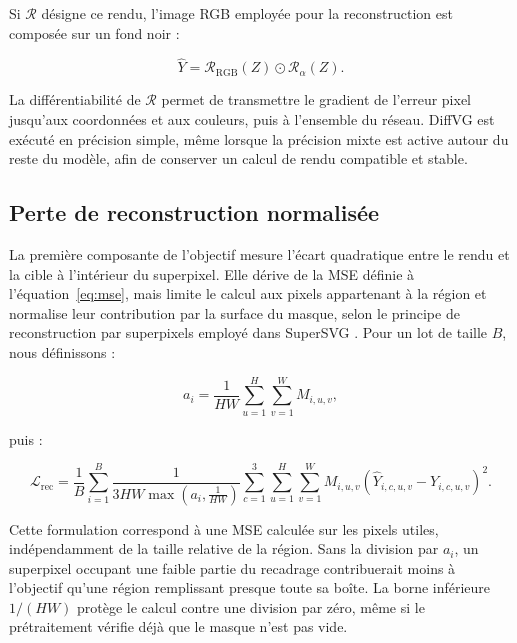 \documentclass[12pt, a4paper, oneside]{report}
\begin{document}
Si $\mathcal{R}$ désigne ce rendu, l'image RGB employée pour la reconstruction est composée sur un fond noir :

\begin{equation}
    \widehat{Y} = \mathcal{R}_{\mathrm{RGB}}(Z)
    \odot \mathcal{R}_{\alpha}(Z).
    \label{eq:composition_rendu}
\end{equation}

La différentiabilité de $\mathcal{R}$ permet de transmettre le gradient de l'erreur pixel jusqu'aux coordonnées et aux couleurs, puis à l'ensemble du réseau. DiffVG est exécuté en précision simple, même lorsque la précision mixte est active autour du reste du modèle, afin de conserver un calcul de rendu compatible et stable.

\subsection{Perte de reconstruction normalisée}

La première composante de l'objectif mesure l'écart quadratique entre le rendu et la cible à l'intérieur du superpixel. Elle dérive de la MSE définie à l'équation~\eqref{eq:mse}, mais limite le calcul aux pixels appartenant à la région et normalise leur contribution par la surface du masque, selon le principe de reconstruction par superpixels employé dans SuperSVG \cite{hu2024supersvg}. Pour un lot de taille $B$, nous définissons :

\begin{equation}
    a_i = \frac{1}{HW}\sum_{u=1}^{H}\sum_{v=1}^{W}M_{i,u,v},
    \label{eq:ratio_surface_masque}
\end{equation}

puis :

\begin{equation}
    \mathcal{L}_{\mathrm{rec}} =
    \frac{1}{B}\sum_{i=1}^{B}
    \frac{1}{3HW\max\!\left(a_i,\frac{1}{HW}\right)}
    \sum_{c=1}^{3}\sum_{u=1}^{H}\sum_{v=1}^{W}
    M_{i,u,v}\left(\widehat{Y}_{i,c,u,v}-Y_{i,c,u,v}\right)^2.
    \label{eq:perte_reconstruction_approche}
\end{equation}

Cette formulation correspond à une MSE calculée sur les pixels utiles, indépendamment de la taille relative de la région. Sans la division par $a_i$, un superpixel occupant une faible partie du recadrage contribuerait moins à l'objectif qu'une région remplissant presque toute sa boîte. La borne inférieure $1/(HW)$ protège le calcul contre une division par zéro, même si le prétraitement vérifie déjà que le masque n'est pas vide.
\end{document}
